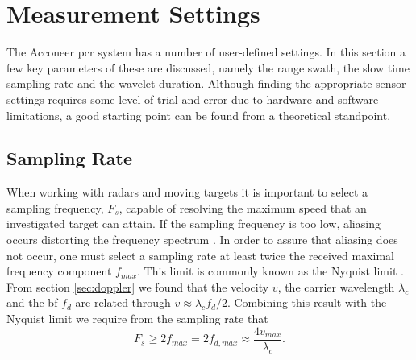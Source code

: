 \section{Measurement Settings}

The Acconeer \gls{pcr} system has a number of user-defined settings. In this section a few key parameters of these are discussed, namely the range swath, the slow time sampling rate and the wavelet duration. Although finding the appropriate sensor settings requires some level of trial-and-error due to hardware and software limitations, a good starting point can be found from a theoretical standpoint. 

\subsection{Sampling Rate}\label{sec:srate}
When working with radars and moving targets it is important to select a sampling frequency, $F_s$, capable of resolving the maximum speed that an investigated target can attain. If the sampling frequency is too low, aliasing occurs distorting the frequency spectrum \citep{lindgren_rootzezn_sandsten_2014}. In order to assure that aliasing does not occur, one must select a sampling rate at least twice the received maximal frequency component $f_{max}$. This limit is commonly known as the Nyquist limit \citep{proakis_manolakis_1995}. From section \ref{sec:doppler} we found that the velocity $v$, the carrier wavelength $\lambda_c$ and the \gls{bf} $f_d$ are related through $v \approx \lambda_cf_d/2$. Combining this result with the Nyquist limit we require from the sampling rate that
\begin{equation}
\label{eq:nyquist}
		F_{s} \geq 2f_{max} 
		= 2f_{d,max} 
		\approx \frac{4v_{max}}{\lambda_c}.
\end{equation}

